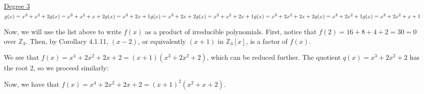 \underline{Degree 3} \\
$%
g(x) = x^3 + x^2 + 2 \\
g(x) = x^3 + x^2 + x + 2 \\
g(x) = x^3 + 2x + 1 \\
g(x) = x^3 + 2x + 2 \\
g(x) = x^3 + x^2 + 2x + 1 \\
g(x) = x^3 + 2x^2 + 2x + 2 \\
g(x) = x^3 + 2x^2 + 1 \\
g(x) = x^3 + 2x^2 + x + 1 \\
$

Now, we will use the list above to write $f(x)$ as a product of irreducible polynomials. First, notice that $f(2) = 16 + 8 + 4 + 2 = 30 = 0$ over $\mathbb{Z}_3$. Then, by Corollary 4.1.11, $(x - 2)$, or equivalently $(x + 1)$ in $\mathbb{Z}_3[x]$, is a factor of $f(x)$.


We see that $f(x) = x^4 + 2x^2 + 2x + 2 = (x + 1)(x^3 + 2x^2 + 2)$, which can be reduced further. The quotient $q(x) = x^3 + 2x^2 + 2$ has the root 2, so we proceed similarly:


Now, we have that $f(x) = x^4 + 2x^2 + 2x + 2 = (x + 1)^2(x^2 + x + 2)$.